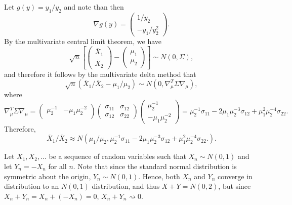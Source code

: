 \begin{ex}
  Let $g(y)=y_1/y_2$ and note than then
  \[
    \nabla g(y) = \begin{pmatrix}
      1/y_2 \\ -y_1/y_2^2
    \end{pmatrix}.
  \]
  By the multivariate central limit theorem, we have
  \[
    \sqrt{n}\left[\begin{pmatrix}
        \overline{X}_{1} \\ \overline{X}_{2}
      \end{pmatrix}-\begin{pmatrix}
        \mu_1 \\ \mu_2
      \end{pmatrix}\right]\sim N(0, \Sigma),
  \]
  and therefore it follows by the multivariate delta method that
  \[
    \sqrt{n}\left(
    \overline{X}_{1}/\overline{X}_{2} - \mu_1/\mu_2
    \right)\sim N(0, \nabla^T_\mu\Sigma\nabla_\mu),
  \]
  where
  \[
    \nabla^T_\mu\Sigma\nabla_\mu
    =\begin{pmatrix}
      \mu_2^{-1} & -\mu_1\mu_2^{-2} \\
    \end{pmatrix}
    \begin{pmatrix}
      \sigma_{11} & \sigma_{12} \\
      \sigma_{12} & \sigma_{22}
    \end{pmatrix}
    \begin{pmatrix}
      \mu_2^{-1} \\ -\mu_1\mu_2^{-2}
    \end{pmatrix}
    =\mu_2^{-1}\sigma_{11}
    -2\mu_1\mu_2^{-3}\sigma_{12}
    +\mu_1^2\mu_2^{-4}\sigma_{22}.
  \]
  Therefore,
  \[
    \overline{X}_{1}/\overline{X}_{2}\approx
    N(\mu_1/\mu_2,
    \mu_2^{-1}\sigma_{11}
    -2\mu_1\mu_2^{-3}\sigma_{12}
    +\mu_1^2\mu_2^{-4}\sigma_{22}.
    ).
  \]
\end{ex}

\begin{ex}
  Let $X_1, X_2, \ldots$ be a sequence of random variables such that
  $X_n\sim N(0, 1)$ and let $Y_n=-X_n$ for all $n$. Note that since the standard
  normal distribution is symmetric about the origin, $Y_n\sim N(0, 1)$. Hence,
  both $X_n$ and $Y_n$ converge in distribution to an $N(0, 1)$ distribution,
  and thus $X + Y=N(0, 2)$, but since $X_n+Y_n=X_n+(-X_n)=0$,
  $X_n+Y_n\rightsquigarrow 0$.
\end{ex}